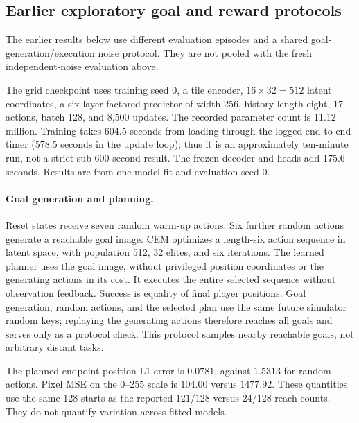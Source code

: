 \begin{table}[ht]
\centering
\caption{Craftax success by target displacement. The first column includes all 384 starts; the
others retain 247 displaced targets and 99 targets at least two grid cells away.}
\label{tab:craftax}
\end{table}

\subsection{Earlier exploratory goal and reward protocols}
The earlier results below use different evaluation episodes and a shared goal-generation/execution
noise protocol. They are not pooled with the fresh independent-noise evaluation above.

The grid checkpoint uses training seed 0, a tile encoder, $16\times32=512$ latent coordinates,
a six-layer factored predictor of width 256, history length eight, 17 actions, batch 128, and
8,500 updates. The recorded parameter count is 11.12 million. Training takes 604.5 seconds from
loading through the logged end-to-end timer (578.5 seconds in the update loop); thus it is an
approximately ten-minute run, not a strict sub-600-second result. The frozen decoder and heads add
175.6 seconds. Results are from one model fit and evaluation seed 0.

\paragraph{Goal generation and planning.}
Reset states receive seven random warm-up actions. Six further random actions generate a reachable
goal image. CEM optimizes a length-six action sequence in latent space, with population 512,
32 elites, and six iterations. The learned planner uses the goal image, without privileged position
coordinates or the generating actions in its cost. It executes the entire selected sequence without
observation feedback. Success is equality of final player positions. Goal generation, random actions,
and the selected plan use the same future simulator random keys; replaying the generating actions
therefore reaches all goals and serves only as a protocol check. This protocol samples nearby
reachable goals, not arbitrary distant tasks.

The planned endpoint position L1 error is $0.0781$, against $1.5313$ for random actions. Pixel MSE
on the 0--255 scale is $104.00$ versus $1477.92$. These quantities use the same 128 starts as the
reported $121/128$ versus $24/128$ reach counts. They do not quantify variation across fitted models.

